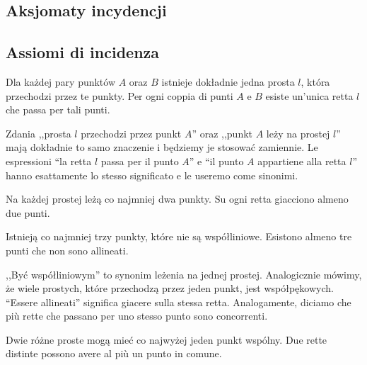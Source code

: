 
%

\subsection{Aksjomaty incydencji} %
\subsection{Assiomi di incidenza} %

\begin{axiom}
[incydencji, I1] %
[di incidenza, I1] %
    Dla każdej pary punktów $A$ oraz $B$ istnieje dokładnie jedna prosta $l$, która przechodzi przez te punkty. %
    Per ogni coppia di punti $A$ e $B$ esiste un'unica retta $l$ che passa per tali punti. %
\end{axiom}

Zdania ,,prosta $l$ przechodzi przez punkt $A$'' oraz ,,punkt $A$ leży na prostej $l$'' mają dokładnie to samo znaczenie i będziemy je stosować zamiennie. %
Le espressioni ``la retta $l$ passa per il punto $A$'' e ``il punto $A$ appartiene alla retta $l$'' hanno esattamente lo stesso significato e le useremo come sinonimi. %

\begin{axiom}
[incydencji, I2] %
[di incidenza, I2] %
    Na każdej prostej leżą co najmniej dwa punkty. %
    Su ogni retta giacciono almeno due punti. %
\end{axiom}

\begin{axiom}
[incydencji, I3] %
[di incidenza, I3] %
    Istnieją co najmniej trzy punkty, które nie są współliniowe. %
    Esistono almeno tre punti che non sono allineati. %
\end{axiom}

,,Być współliniowym'' to synonim leżenia na jednej prostej. %
Analogicznie mówimy, że wiele prostych, które przechodzą przez jeden punkt, jest współpękowych. %
``Essere allineati'' significa giacere sulla stessa retta. %
Analogamente, diciamo che più rette che passano per uno stesso punto sono concorrenti. %

\begin{proposition}
    Dwie różne proste mogą mieć co najwyżej jeden punkt wspólny. %
    Due rette distinte possono avere al più un punto in comune. %
\end{proposition}

